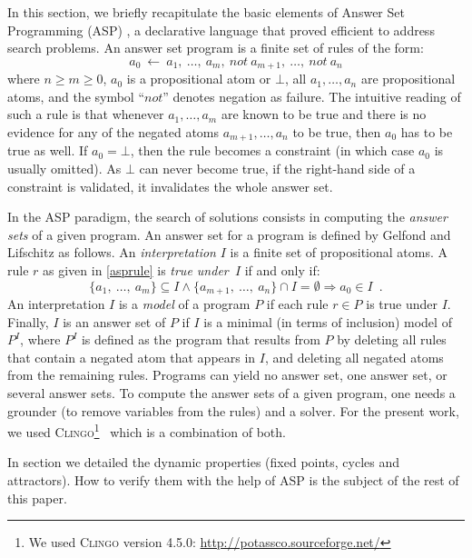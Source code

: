 In this section, we briefly recapitulate the basic elements of Answer Set Programming (ASP) \cite{baral2003knowledge}, a  declarative language that proved efficient to address search problems. An answer set program is a finite set of rules of the form:
\begin{equation}
\label{asprule}
  a_{0}\ \leftarrow \ a_{1},\ \ldots,\ a_{m},\ not\ a_{m+1},\ \ldots,\ not\ a_{n}
\end{equation}
where $n \ge m \ge 0$, $a_{0}$ is a propositional atom or $\bot$, all
$a_{1}, \ldots ,a_{n}$ are propositional atoms, and the symbol ``$not$'' denotes  negation as failure.
The intuitive reading of such a rule is that whenever $a_{1}, \ldots, a_{m}$
are known to be true and there is no evidence for any of the negated atoms $a_{m+1}, \ldots, a_{n}$ to be true, then $a_{0}$ has to be true as well.
If $a_{0} = \bot$, then the rule becomes a constraint (in which case $a_{0}$ is usually omitted).
As $\bot$ can never become true, if the right-hand side of a constraint is validated, it invalidates the whole answer set.

In the ASP paradigm, the search of solutions consists in computing the \emph{answer sets} of a given program.
An answer set for a program is defined by Gelfond and Lifschitz \cite{DBLP:conf/iclp/GelfondL88} as follows.
An \emph{interpretation} $I$ is a finite set of propositional atoms.
A rule $r$ as given in \eqref{asprule} is \emph{true under~$I$} if and only if:
  \[\{a_1,\ \dots,\ a_{m}\} \subseteq I \wedge \{a_{m+1},\ \ldots,\ a_{n}\} \cap I = \emptyset \Rightarrow a_{0} \in I \enspace.\]
An interpretation $I$ is a \emph{model} of a program $P$ if each rule $r \in P$ is true under $I$.
Finally, $I$ is an answer set of $P$ if $I$ is a minimal (in terms of inclusion) model of $P^{I}$,
where $P^{I}$ is defined as the program that results from $P$ by deleting all rules that contain a negated atom that appears in $I$,
and deleting all negated atoms from the remaining rules.
Programs can yield no answer set, one answer set, or several answer sets.
To compute the answer sets of a given program, one needs a grounder (to remove variables from the rules) and a solver.
For the present work, we used \textsc{Clingo}\footnote{We used \textsc{Clingo} version 4.5.0: \url{http://potassco.sourceforge.net/}}~\cite{gebser2010incremental} which is a combination of both.

In section  we detailed the dynamic properties (fixed points, cycles and attractors). How to verify them with the help of ASP is the subject of the rest of this paper.
